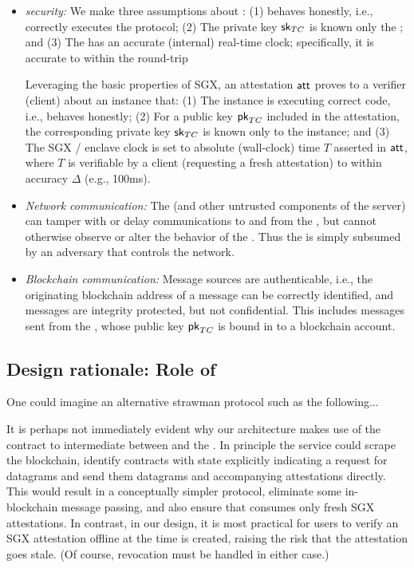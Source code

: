\begin{itemize}
\item {\em \encname security:} We make three assumptions about \encname : (1) \enname behaves honestly, i.e., correctly executes the \tc protocol; (2) The private key ${{\sf sk}_{TC}}$ is known only the \encname; and (3) The \encname has an accurate (internal) real-time clock; specifically, it is accurate to within the round-trip

Leveraging the basic properties of SGX, an attestation ${\sf att}$ proves to a verifier (client) about an \encname instance that: (1) The instance is executing correct code, i.e., behaves honestly; (2) For a public key ${\sf pk}_{TC}$ included in the attestation, the corresponding private key ${{\sf sk}_{TC}}$ is known only to the instance; and (3) The SGX / enclave clock is set to absolute (wall-clock) time $T$ asserted in ${\sf att}$, where $T$ is verifiable by a client (requesting a fresh attestation) to within accuracy $\Delta$ (e.g., 100ms).

\item {\em Network communication:} The \medname (and other untrusted components of the \tc server) can tamper with or delay communications to and from the \encname, but cannot otherwise observe or alter the behavior of the \encname. Thus the \medname is simply subsumed by an adversary that controls the network. 

\item {\em Blockchain communication:} Message sources are authenticable, i.e., the originating blockchain address of a message can be correctly identified, and messages are integrity protected, but not confidential. This includes messages sent from the \encname, whose public key ${\sf pk}_{TC}$ is bound in \tc to a blockchain account. 
\end{itemize}

\subsection{Design rationale: Role of \tcont}

One could imagine an alternative strawman protocol such as the following...

It is perhaps not immediately evident why our architecture makes use of the contract \tcont to intermediate between \reqcont and the \encname. In principle the \tc service could scrape the blockchain, identify contracts with state explicitly indicating a request for datagrams and send them datagrams and accompanying attestations directly.  This would result in a conceptually simpler protocol, eliminate some in-blockchain message passing, and also ensure that \reqcont consumes only fresh SGX attestations. In contrast, in our design, it is most practical for users to verify an SGX attestation offline at the time \reqcont is created, raising the risk that the attestation goes stale. (Of course, revocation must be handled in either case.)

